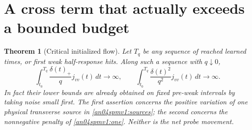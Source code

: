 \documentclass[11pt]{article}
\newtheorem{theorem}{Theorem}\newtheorem{lemma}{Lemma}
\begin{document}
\section{A cross term that actually exceeds a bounded budget}
\begin{theorem}[Critical initialized flow]\label{an04spmv1:divergence}
Let $T_q$ be any sequence of reached learned times, or first weak
half-response hits. Along such a sequence with $q\downarrow0$,
\[
 \int_{t_0}^{T_q}\frac{\delta(t)_+}{q}j_{vv}(t)\,dt\to\infty,
 \qquad
 \int_{t_0}^{T_q}\frac{\delta(t)^2}{q^2}j_{vv}(t)\,dt\to\infty .
\]
In fact their lower bounds are already obtained on fixed pre-weak
intervals by taking noise small first. The first assertion concerns
the positive variation of one physical transverse source in
\eqref{an04spmv1:sources}; the second concerns the nonnegative
penalty of \eqref{an04spmv1:one}. Neither is the net probe movement.
\end{theorem}
\end{document}
